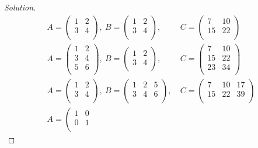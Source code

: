 \documentclass{article}
\theoremstyle{definition}
\begin{document}
\begin{proof}[Solution]
		
		\begin{align*}
			A=
			\left(\begin{array}{cc}
				1&2\\
				3&4\\
			\end{array}\right)
			,~
			B=
			\left(\begin{array}{cc}
				1&2\\
				3&4\\
			\end{array}\right)
			,&~
			C=
			\left(\begin{array}{cc}
				7&10\\
				15&22\\
			\end{array}\right)
			\\
			A=
			\left(\begin{array}{cc}
				1&2\\
				3&4\\
			5&6\\		
			\end{array}\right)
			,~
			B=
			\left(\begin{array}{cc}
				1&2\\
				3&4\\
			\end{array}\right)
			,&~
			C=
			\left(\begin{array}{cc}
				7&10\\
				15&22\\
				23&34\\
			\end{array}\right)
			\\
			A=
			\left(\begin{array}{cc}
				1&2\\
				3&4\\
			\end{array}\right)
			,~
			B=
			\left(\begin{array}{ccc}
				1&2&5\\
				3&4&6\\
			\end{array}\right)
			,&~
			C=
			\left(\begin{array}{ccc}
				7&10&17\\
				15&22&39\\
			\end{array}\right)
			\\
			A=
			\left(\begin{array}{cc}
				1&0\\
				0&1\\

\end{array}
\end{align*}
\end{proof}
\end{document}
